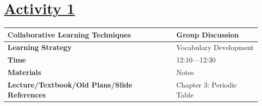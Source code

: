 \documentclass{article}
\begin{document}
\section*{\underline{Activity 1}}
\vspace{0.2cm}
\begin{tabular}{|p{4.2cm}|p{9.8cm}|}
\hline
\textbf{Collaborative Learning Techniques} & Group Discussion\\
\hline
\textbf{Learning Strategy} & Vocabulary Development \\
\hline
\textbf{Time} & 12:10---12:30\\
\hline
\textbf{Materials} & Notes \\
\hline
\textbf{Lecture/Textbook/Old Plans/Slide References} & Chapter 3: Periodic Table\\
\hline
\end{tabular}

\vspace{0.5cm}
\end{document}
